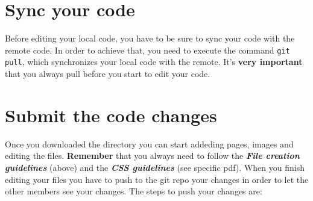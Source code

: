 \documentclass[a4paper,12pt]{article}
\newcommand{\<}{\textless}
\renewcommand{\>}{\textgreater}
\begin{document}
\section{Sync your code}
Before editing your local code, you have to be sure to sync your code with the remote code. In order to achieve that, you need to execute the command \texttt{git pull}, which synchronizes your local code with the remote. It's \textbf{very important} that you always pull before you start to edit your code.


\section{Submit the code changes}
Once you downloaded the directory you can start addeding pages, images and editing the files. 
\textbf{Remember} that you always need to follow the \textbf{\textit{File creation guidelines}} (above) and the \textbf{\textit{CSS guidelines}} (see specific pdf).
When you finish editing your files you have to push to the git repo your changes in order to let the other members see your changes. 
The steps to push your changes are:
\end{document}
